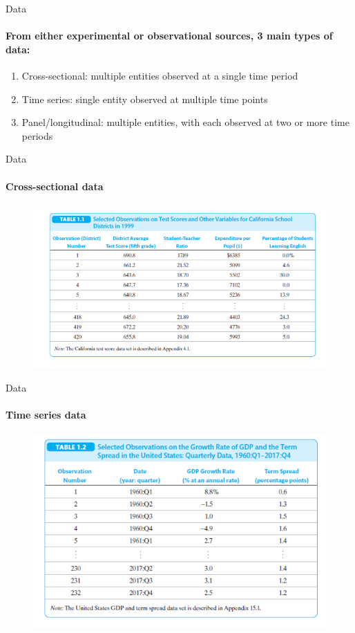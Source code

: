 \documentclass[11pt,english]{beamer}
\begin{document}
\begin{frame}{Data}
\framesubtitle{From either experimental or observational sources, 3 main types of data:}
	 \pause 
	\begin{enumerate}
		\item Cross-sectional: multiple entities observed at a single time period \pause  
		\item Time series: single entity observed at multiple time points \pause 
		\item Panel/longitudinal: multiple entities, with each observed at two or more time periods
	\end{enumerate}

\end{frame}

\begin{frame}{Data}
\framesubtitle{Cross-sectional data}
	\begin{figure}
		\centering
		\includegraphics[width = 0.9\linewidth]{xsection_data.png}
	\end{figure}
\end{frame}

\begin{frame}{Data}
\framesubtitle{Time series data}
	\begin{figure}
		\centering
		\includegraphics[width = 0.9\linewidth]{ts_data.png}
	\end{figure}
\end{frame}
\end{document}
